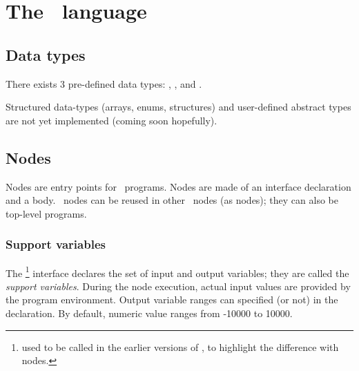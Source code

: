 



\section{The \lutin\ language}


\subsection{Data types}

There exists 3 pre-defined data types: , , and
. 

Structured data-types (arrays, enums, structures) and user-defined
abstract types are not yet implemented (coming soon hopefully).

\subsection{Nodes}

Nodes are  entry points for \lutin\  programs.  Nodes are  made of an
interface  declaration and  a body.  \lutin\ nodes  can be  reused in
other \lutin\  nodes (as \lustre  nodes); they can also  be top-level
programs. 

\subsubsection{Support variables}

The \footnote{used to be called  in the earlier
  versions  of  \lutin,  to  highlight the  difference  with  \lustre
  nodes.}  interface declares the  set of input and output variables;
they  are  called  the  {\em  support variables}.   During  the  node
execution,  actual   input  values   are  provided  by   the  program
environment.  Output  variable ranges can  specified (or not)  in the
declaration. By default, numeric value ranges from -10000 to 10000.




